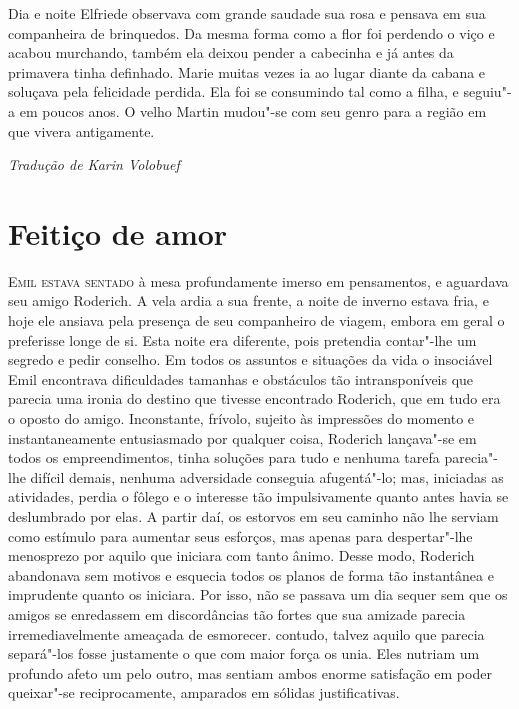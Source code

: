Dia e noite Elfriede observava com grande saudade sua rosa e pensava em
sua companheira de brinquedos. Da mesma forma como a flor foi perdendo
o viço e acabou murchando, também ela deixou pender a cabecinha e já
antes da primavera tinha definhado. Marie muitas vezes ia ao lugar
diante da cabana e soluçava pela felicidade perdida. Ela foi se
consumindo tal como a filha, e seguiu"-a em poucos anos. O velho Martin
mudou"-se com seu genro para a região em que vivera antigamente.
\medskip

\hfill\textit{Tradução de Karin Volobuef}


\chapter{Feitiço de amor}


\textsc{Emil estava sentado} à mesa profundamente imerso em pensamentos, e
aguardava seu amigo Roderich. A vela ardia a sua frente, a noite de
inverno estava fria, e hoje ele ansiava pela presença de seu
companheiro de viagem, embora em geral o preferisse longe de si. Esta
noite era diferente, pois pretendia contar"-lhe um segredo e pedir
conselho. Em todos os assuntos e situações da vida o insociável Emil
encontrava dificuldades tamanhas e obstáculos tão intransponíveis que
parecia uma ironia do destino que tivesse encontrado Roderich, que em
tudo era o oposto do amigo. Inconstante, frívolo, sujeito às impressões
do momento e instantaneamente entusiasmado por qualquer coisa, Roderich
lançava"-se em todos os empreendimentos, tinha soluções para tudo e
nenhuma tarefa parecia"-lhe difícil demais, nenhuma adversidade
conseguia afugentá"-lo; mas, iniciadas as atividades, perdia o fôlego e
o interesse tão impulsivamente quanto antes havia se deslumbrado por
elas. A partir daí, os estorvos em seu caminho não lhe serviam como
estímulo para aumentar seus esforços, mas apenas para despertar"-lhe
menosprezo por aquilo que iniciara com tanto ânimo. Desse modo,
Roderich abandonava sem motivos e esquecia todos os planos de forma tão
instantânea e imprudente quanto os iniciara. Por isso, não se passava
um dia sequer sem que os amigos se enredassem em \mbox{discordâncias} tão
fortes que sua amizade parecia irremediavelmente ameaçada de esmorecer.
contudo, \mbox{talvez} aquilo que parecia separá"-los fosse justamente o que 
com maior força os unia. Eles nutriam um profundo afeto um pelo
outro, mas  sentiam ambos enorme satisfação em poder queixar"-se
reciprocamente, amparados em sólidas justificativas. 

